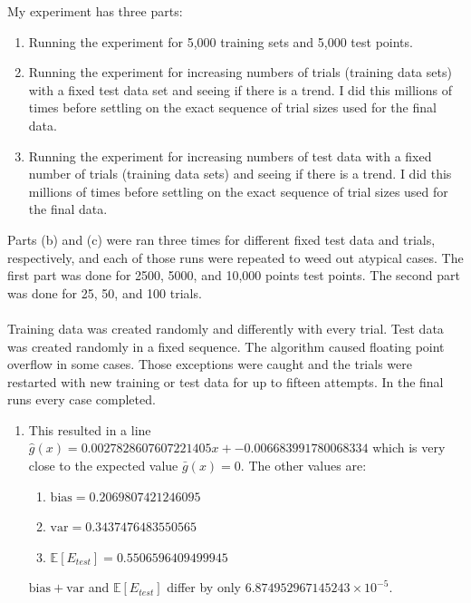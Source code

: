 \documentclass[12pt]{article}
\newcommand{\Expect}{\mathbb{E}}
\newcommand{\Bias}{\bm{\mathrm{bias}}}
\newcommand{\Var}{\bm{\mathrm{var}}}
\begin{document}
\begin{enumerate}
\begin{enumerate}
    \end{enumerate}
\pagebreak
    My experiment has three parts:
    \begin{enumerate}
        \item Running the experiment for 5,000 training sets and 5,000 test points.
        \item Running the experiment for increasing numbers of trials (training data sets) with a fixed test data set and seeing if there is a trend.  I did this millions of times before settling on the exact sequence of trial sizes used for the final data.
        \item Running the experiment for increasing numbers of test data with a fixed number of trials (training data sets) and seeing if there is a trend.  I did this millions of times before settling on the exact sequence of trial sizes used for the final data.
    \end{enumerate}
    Parts (b) and (c) were ran three times for different fixed test data and trials, respectively, and each of those runs were repeated to weed out atypical cases.  The first part was done for 2500, 5000, and 10,000 points test points.  The second part was done for 25, 50, and 100 trials.
    \\\\
    Training data was created randomly and differently with every trial.  Test data was created randomly in a fixed sequence.  The algorithm caused floating point overflow in some cases.  Those exceptions were caught and the trials were restarted  with new training or test data for up to fifteen attempts.  In the final runs every case completed.
    \begin{enumerate}
        \item This resulted in a line $\hat{g}(x) = 0.0027828607607221405x + -0.006683991780068334$ which is very close to the expected value $\bar{g}(x) = 0$.  The other values are:
        \begin{enumerate}
            \item $\Bias = 0.2069807421246095$
            \item $\Var = 0.3437476483550565$
            \item $\Expect[E_{test}] = 0.5506596409499945$
        \end{enumerate}
        $\Bias + \Var$ and $\Expect[E_{test}]$ differ by only $6.874952967145243 \times 10^{-5}$.

\end{enumerate}
\end{enumerate}
\end{document}
